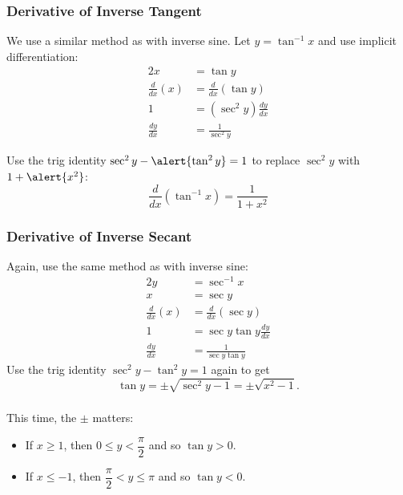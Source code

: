 \documentclass[14pt]{beamer}
\begin{document}
\begin{frame}
\frametitle{\small Derivative of Inverse Tangent}
\footnotesize
We use a similar method as with inverse sine.  Let $y=\tan^{-1}x$ and use implicit differentiation:
\vspace{-0.5pc}
\begin{alignat*}{2}
x &= \tan y \\
\frac{d}{dx}(x) &= \frac{d}{dx} (\tan y) \\
1 &= (\sec^2 y) \frac{dy}{dx} \\
\frac{dy}{dx} &= \frac{1}{\sec^2 y}
\end{alignat*}

\vspace{1pc}
Use the trig identity $\sec^2 y-\alert{\tan^2 y}=1$ to replace $\sec^2 y$ with $1+\alert{x^2}$:
\[\frac{d}{dx}(\tan^{-1} x)=\frac{1}{1+x^2}\]
\end{frame}

\begin{frame}
\frametitle{\small Derivative of Inverse Secant}
\footnotesize
Again, use the same method as with inverse sine:
\begin{alignat*}{2}
y &= \sec^{-1}x \\
x &= \sec y \\
\frac{d}{dx}(x) &= \frac{d}{dx} (\sec y) \\
1 &= \sec y \tan y \frac{dy}{dx} \\
\frac{dy}{dx} &= \frac{1}{\sec y \tan y}
\end{alignat*}
Use the trig identity $\sec^2 y-\tan^2 y=1$ again to get 
\[\tan y=\pm\sqrt{\sec^2 y-1}=\pm\sqrt{x^2-1}.\]
\end{frame}

\begin{frame}
\frametitle{}
\footnotesize
This time, the $\pm$ matters:

\vspace{0.25pc}
\begin{itemize}
\item If $x \ge 1$, then $0\le y<\dfrac{\pi}{2}$ and so $\tan y >0.$  

\vspace{-0.5pc}
\item If $x \le -1$, then $\dfrac{\pi}{2} < y \le \pi$ and so  $\tan y <0$.  
\end{itemize}
\end{frame}
\end{document}
